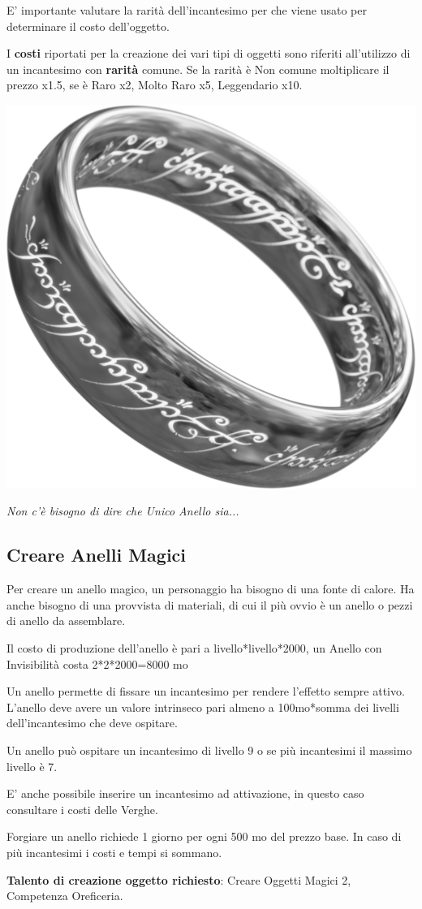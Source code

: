 \begin{multicols}{2}
E' importante valutare la rarità dell'incantesimo per che viene usato per determinare il costo dell'oggetto.

I \textbf{costi} riportati per la creazione dei vari tipi di oggetti sono riferiti all'utilizzo di un incantesimo con \textbf{rarità} comune. Se la rarità è Non comune moltiplicare il prezzo x1.5, se è Raro x2, Molto Raro x5, Leggendario x10.

\begin{center}
	\includegraphics[width=0.3\linewidth]{immagini/onering2.png}

	\emph{Non c'è bisogno di dire che Unico Anello sia...}
\end{center}

\subsection{Creare Anelli Magici}\label{creareanellimagici}

Per creare un anello magico, un personaggio ha bisogno di una fonte di calore. Ha anche bisogno di una provvista di materiali, di cui il più ovvio è un anello o pezzi di anello da assemblare.

Il costo di produzione dell'anello è pari a livello*livello*2000, un Anello con Invisibilità costa 2*2*2000=8000 mo

Un anello permette di fissare un incantesimo per rendere l'effetto sempre attivo.
L'anello deve avere un valore intrinseco pari almeno a 100mo*somma dei livelli dell'incantesimo che deve ospitare.

Un anello può ospitare un incantesimo di livello 9 o se più incantesimi il massimo livello è 7.

E' anche possibile inserire un incantesimo ad attivazione, in questo caso consultare i costi delle Verghe.

Forgiare un anello richiede 1 giorno per ogni 500 mo del prezzo base. In caso di più incantesimi i costi e tempi si sommano.

\medskip

\textbf{Talento di creazione oggetto richiesto}: Creare Oggetti Magici 2, Competenza Oreficeria.


\end{multicols}

